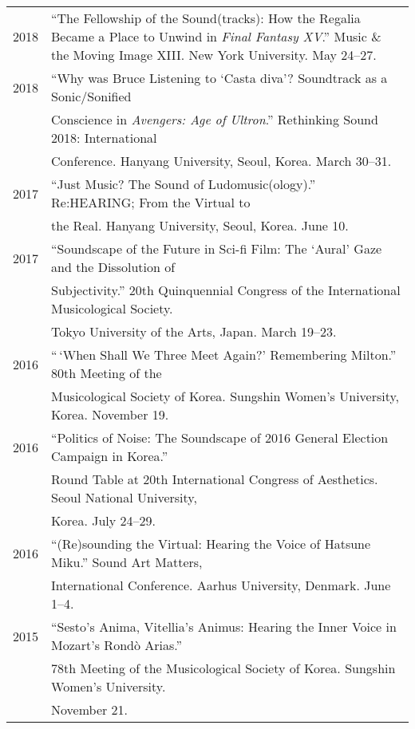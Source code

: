 \documentclass[a4paper,11pt]{article}
\begin{document}
  \hspace*{-0.25cm}
  \begin{tabular}{p{2.5cm} p{12.5cm}}
  2018 & “The Fellowship of the Sound(tracks): How the Regalia Became a Place to Unwind in \textit{Final Fantasy XV}.” Music \& the Moving Image XIII. New York University. May 24--27.\\[2mm]
  
  2018 & “Why was Bruce Listening to ‘Casta diva’? Soundtrack as a Sonic/Sonified\\
  & Conscience in \textit{Avengers: Age of Ultron}.” Rethinking Sound 2018: International\\
  & Conference. Hanyang University, Seoul, Korea. March 30--31.\\[2mm]
  
  2017 & “Just Music? The Sound of Ludomusic(ology).” Re:HEARING; From the Virtual to\\
  & the Real. Hanyang University, Seoul, Korea. June 10.\\[2mm]
  
  2017 & “Soundscape of the Future in Sci-fi Film: The ‘Aural’ Gaze and the Dissolution of\\
  & Subjectivity.” 20th Quinquennial Congress of the International Musicological Society.\\
  & Tokyo University of the Arts, Japan. March 19--23.\\[2mm]
  
  2016 & “\,‘When Shall We Three Meet Again?’ Remembering Milton.” 80th Meeting of the\\
  & Musicological Society of Korea. Sungshin Women’s University, Korea. November 19.\\[2mm]

  2016 & “Politics of Noise: The Soundscape of 2016 General Election Campaign in Korea.”\\
  & Round Table at 20th International Congress of Aesthetics. Seoul National University,\\
  & Korea. July 24--29.\\[2mm]
  
  2016 & “(Re)sounding the Virtual: Hearing the Voice of Hatsune Miku.” Sound Art Matters,\\
  & International Conference. Aarhus University, Denmark. June 1--4.\\[2mm]
  
  2015 & “Sesto’s Anima, Vitellia’s Animus: Hearing the Inner Voice in Mozart’s Rond\`{o} Arias.”\\
  & 78th Meeting of the Musicological Society of Korea. Sungshin Women’s University.\\
  & November 21.\\[2mm]
  

\end{tabular}
\end{document}
